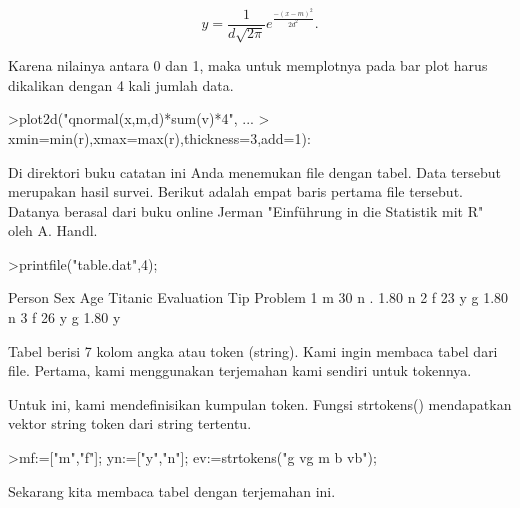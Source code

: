 \documentclass[a4paper,10pt]{article}
\begin{document}
\begin{eulernotebook}
\begin{eulercomment}
\begin{eulercomment}
\begin{eulercomment}
\end{eulercomment}
\begin{eulerformula}
\[
y=\frac{1}{d\sqrt{2\pi}}e^{\frac{-(x-m)^2}{2d^2}}.
\]
\end{eulerformula}
\begin{eulercomment}
Karena nilainya antara 0 dan 1, maka untuk memplotnya pada bar plot
harus dikalikan dengan 4 kali jumlah data.
\end{eulercomment}
\begin{eulerprompt}
>plot2d("qnormal(x,m,d)*sum(v)*4", ...
>  xmin=min(r),xmax=max(r),thickness=3,add=1):
\end{eulerprompt}
\begin{eulercomment}
Di direktori buku catatan ini Anda menemukan file dengan tabel. Data
tersebut merupakan hasil survei. Berikut adalah empat baris pertama
file tersebut. Datanya berasal dari buku online Jerman "Einführung in
die Statistik mit R" oleh A. Handl.
\end{eulercomment}
\begin{eulerprompt}
>printfile("table.dat",4);
\end{eulerprompt}
\begin{euleroutput}
  Person Sex Age Titanic Evaluation Tip Problem
  1 m 30 n . 1.80 n
  2 f 23 y g 1.80 n
  3 f 26 y g 1.80 y
\end{euleroutput}
\begin{eulercomment}
Tabel berisi 7 kolom angka atau token (string). Kami ingin membaca
tabel dari file. Pertama, kami menggunakan terjemahan kami sendiri
untuk tokennya.

Untuk ini, kami mendefinisikan kumpulan token. Fungsi strtokens()
mendapatkan vektor string token dari string tertentu.
\end{eulercomment}
\begin{eulerprompt}
>mf:=["m","f"]; yn:=["y","n"]; ev:=strtokens("g vg m b vb");
\end{eulerprompt}
\begin{eulercomment}
Sekarang kita membaca tabel dengan terjemahan ini.


\end{eulercomment}
\end{eulercomment}
\end{eulercomment}
\end{eulernotebook}
\end{document}
